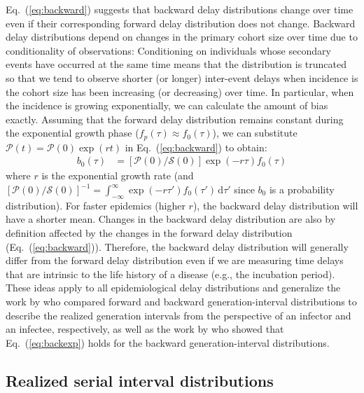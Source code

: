 \documentclass[12pt]{article}
\newcommand{\eref}[1]{Eq.~(\ref{eq:#1})}
\newcommand{\dd}[1]{\ensuremath{\, \mathrm{d}#1}}
\newcommand{\dtau}{\dd{\tau}}
\newcommand{\psize}{{\mathcal P}} %
\newcommand{\ssize}{{\mathcal S}} %
\begin{document}
\eref{backward} suggests that backward delay distributions change over time even if their corresponding forward delay distribution does not change.
Backward delay distributions depend on changes in the primary cohort size over time due to conditionality of observations:
Conditioning on individuals whose secondary events have occurred at the same time means that the distribution is truncated so that we tend to observe shorter (or longer) inter-event delays when incidence is  the cohort size has been increasing (or decreasing) over time.
In particular, when the incidence is growing exponentially, we can calculate the amount of bias exactly.
Assuming that the forward delay distribution remains constant during the exponential growth phase ($f_p(\tau) \approx f_0(\tau)$), we can substitute $\psize(t) = \psize(0) \exp(rt)$ in \eref{backward} to obtain:
\begin{align}
b_0(\tau) &= \left[\psize(0)/\ssize(0)\right] \exp(-r\tau) f_0(\tau)
\label{eq:backexp}
\end{align}
where $r$ is the exponential growth rate (and $\left[\psize(0)/\ssize(0)\right]^{-1} = \int_{-\infty}^{\infty} \exp(-r\tau') f_0(\tau') \dtau'$ since $b_0$ is a probability distribution).
For faster epidemics (higher $r$), the backward delay distribution will have a shorter mean.
Changes in the backward delay distribution are also by definition affected by the changes in the forward delay distribution (\eref{backward}).
Therefore, the backward delay distribution will generally differ from the forward delay distribution even if we are measuring time delays that are intrinsic to the life history of a disease (e.g., the incubation period).
These ideas apply to all epidemiological delay distributions and generalize the work by \cite{champredon2015intrinsic} who compared forward and backward generation-interval distributions to describe the realized generation intervals from the perspective of an infector and an infectee, respectively, as well as the work by \cite{britton2019estimation} who showed that \eref{backexp} holds for the backward generation-interval distributions.

\subsection{Realized serial interval distributions}
\end{document}
